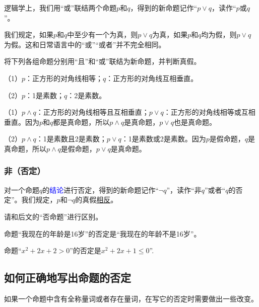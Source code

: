 \documentclass[lang=cn,math=cm,chinesefont=nofont,11pt,scheme=chinese,onecol]{elegantbook}
\begin{document}
逻辑学上，我们用“或”联结两个命题$p$和$q$，得到的新命题记作“$p\lor q$，读作“$p$或$q$”。

我们规定，如果$p$和$q$中至少有一个为真，则$p\lor q$为真，如果$p$和$q$均为假，则$p\lor q$为假。这和日常语言中的“或”“或者”并不完全相同。

\hspace*{\fill}

\begin{example}
  将下列各组命题分别用“且”和“或”联结为新命题，并判断真假。
\end{example}

（1）$p$：正方形的对角线相等；$q$：正方形的对角线互相垂直。

（2）$p$：1是素数；$q$：2是素数。

\begin{solution}
  （1）$p\land q$：正方形的对角线相等且互相垂直；$p\lor q$：正方形的对角线相等或互相垂直。因为$p$和$q$都是真命题，所以$p\land q$是真命题，$p\lor q$也是真命题。

  （2）$p\land q$：1是素数且2是素数；$p\lor q$：1是素数或2是素数。因为$p$是假命题，$q$是真命题，所以$p\land q$是假命题，$p\lor q$是真命题。
\end{solution}

\subsubsection{非（否定）}

对一个命题$q$的\textcolor{blue}{结论}进行否定，得到的新命题记作“$\neg q$”，读作“非$q$”或者“$q$的否定”。我们规定，$p$和$\neg q$的真假\underline{相反}。

\begin{remark}
  请和后文的“否命题”进行区别。
\end{remark}

\begin{example}
  命题“我现在的年龄是16岁”的否定是“我现在的年龄不是16岁”。
\end{example}

\begin{example}
  命题“$x^2+2x+2>0$”的否定是$x^2+2x+1\leq 0$”.
\end{example}

\subsection{如何正确地写出命题的否定}

如果一个命题中含有全称量词或者存在量词，在写它的否定时需要做出一些改变。
\end{document}
